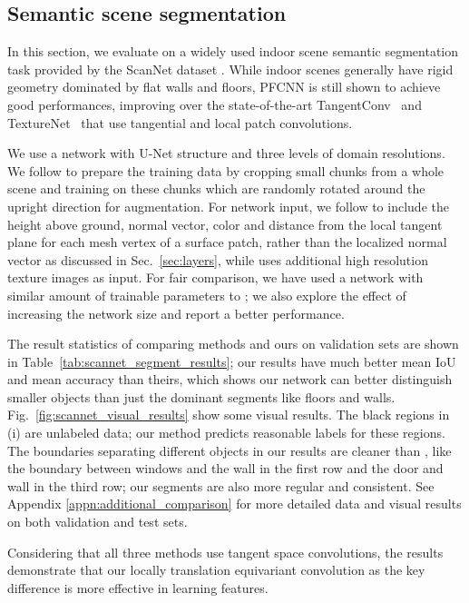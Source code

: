 \documentclass[10pt,twocolumn,letterpaper]{article}
\begin{document}
\subsection{Semantic scene segmentation}
\label{sec:scannet}


In this section, we evaluate on a widely used indoor scene semantic segmentation task provided by the ScanNet dataset \cite{dai2017scannet}.
While indoor scenes generally have rigid geometry dominated by flat walls and floors, PFCNN is still shown to achieve good performances, improving over the state-of-the-art TangentConv~\cite{Koltun:2018:TangentConv} and TextureNet~\cite{Huang_2019_CVPR} that use tangential and local patch convolutions.

We use a network with U-Net structure and three levels of domain resolutions.
We follow \cite{Huang_2019_CVPR} to prepare the training data by cropping small chunks from a whole scene and training on these chunks which are randomly rotated around the upright direction for augmentation. 
For network input, we follow \cite{Koltun:2018:TangentConv} to include the height above ground, normal vector, color and distance from the local tangent plane for each mesh vertex of a surface patch, rather than the localized normal vector as discussed in Sec.~\ref{sec:layers}, while \cite{Huang_2019_CVPR} uses additional high resolution texture images as input.
For fair comparison, we have used a network with similar amount of trainable parameters to \cite{Huang_2019_CVPR};
we also explore the effect of increasing the network size and report a better performance.


The result statistics of comparing methods and ours on validation sets are shown in Table~\ref{tab:scannet_segment_results}; our results have much better mean IoU and mean accuracy than theirs, which shows our network can better distinguish smaller objects than just the dominant segments like floors and walls.
Fig.~\ref{fig:scannet_visual_results} show some visual results. The black regions in (i) are unlabeled data; our method predicts reasonable labels for these regions. The boundaries separating different objects in our results are cleaner than \cite{Huang_2019_CVPR}, like the boundary between windows and the wall in the first row and the door and wall in the third row; our segments are also more regular and consistent.
See Appendix \ref{appn:additional_comparison} for more detailed data and visual results on both validation and test sets.

Considering that all three methods use tangent space convolutions, the results demonstrate that our locally translation equivariant convolution as the key difference is more effective in learning features.
\end{document}
